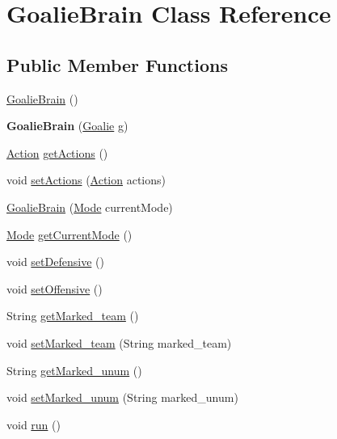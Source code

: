 \hypertarget{classGoalieBrain}{
\section{GoalieBrain Class Reference}
\label{classGoalieBrain}
}
\subsection*{Public Member Functions}
\begin{DoxyCompactItemize}
\item 
\hyperlink{classGoalieBrain_ab41953290ee4a03022065b61cfa1fcf8}{GoalieBrain} ()
\item 
\hypertarget{classGoalieBrain_afcd5b30d276f2f1bdeaf487275a50dc4}{
{\bfseries GoalieBrain} (\hyperlink{classGoalie}{Goalie} g)}
\label{classGoalieBrain_afcd5b30d276f2f1bdeaf487275a50dc4}

\item 
\hyperlink{classAction}{Action} \hyperlink{classGoalieBrain_ae07a39e4385196b62ee791cb43b0fe57}{getActions} ()
\item 
void \hyperlink{classGoalieBrain_a6c696c9b123c07ebaaf1fa072357278b}{setActions} (\hyperlink{classAction}{Action} actions)
\item 
\hyperlink{classGoalieBrain_a404c279dd38842abe9774eeff7bb56a0}{GoalieBrain} (\hyperlink{classMode}{Mode} currentMode)
\item 
\hyperlink{classMode}{Mode} \hyperlink{classGoalieBrain_a72c84bb51ce2d78948dbb500ba9d37f6}{getCurrentMode} ()
\item 
void \hyperlink{classGoalieBrain_ac48806ea1347f6f19618c701e501e693}{setDefensive} ()
\item 
void \hyperlink{classGoalieBrain_a72bd08064a4bd4d7880c75b7cec094c1}{setOffensive} ()
\item 
String \hyperlink{classGoalieBrain_a0c1501fa8e12dd8317e2f6d19bc0dfcf}{getMarked\_\-team} ()
\item 
void \hyperlink{classGoalieBrain_a84d421b2692c1c322cdabb8cd746ab66}{setMarked\_\-team} (String marked\_\-team)
\item 
String \hyperlink{classGoalieBrain_ab4b67d9834099cfc0a3c1edfcd7da379}{getMarked\_\-unum} ()
\item 
void \hyperlink{classGoalieBrain_ab4ed70b7ff134d18c4975af6ec91dbff}{setMarked\_\-unum} (String marked\_\-unum)
\item 
void \hyperlink{classGoalieBrain_a5a680f40c458b231d21473fd397cd448}{run} ()
\end{DoxyCompactItemize}
